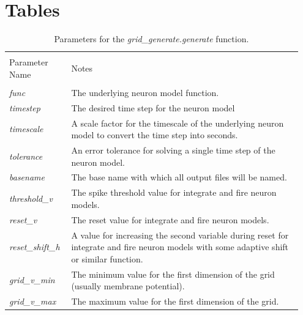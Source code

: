 \documentclass[utf8]{frontiersSCNS} %
\begin{document}


\newpage


\section*{Tables}

\begin{table}[ht!]
\caption{Parameters for the \textit{grid\_generate.generate} function.}
    \centering
    \begin{tabular}{|p{0.2\linewidth} | p{0.75\linewidth}|}
    \hline
    &\\
    Parameter Name & Notes \\
    \hline
    &\\
    \textit{func} & The underlying neuron model function.\\
    \textit{timestep} & The desired time step for the neuron model\\
    \textit{timescale} & A scale factor for the timescale of the underlying neuron model to convert the time step into seconds.\\
    \textit{tolerance} & An error tolerance for solving a single time step of the neuron model.\\
    \textit{basename} & The base name with which all output files will be named.\\
    \textit{threshold\_v} & The spike threshold value for integrate and fire neuron models.\\
    \textit{reset\_v} & The reset value for integrate and fire neuron models.\\
    \textit{reset\_shift\_h} & A value for increasing the second variable during reset for integrate and fire neuron models with some adaptive shift or similar function.\\
    \textit{grid\_v\_min} & The minimum value for the first dimension of the grid (usually membrane potential).\\
    \textit{grid\_v\_max} & The maximum value for the first dimension of the grid.\\

\end{tabular}
\end{table}
\end{document}
